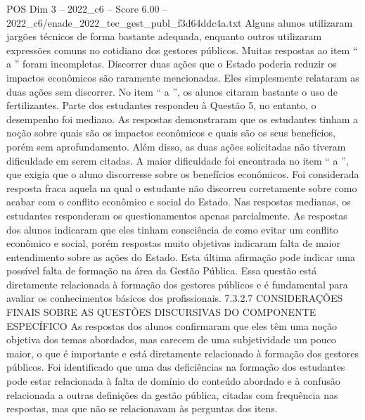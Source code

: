 \begin{textsample}{POS Dim 3 – 2022\_c6 – Score 6.00 – 2022\_c6/enade\_2022\_tec\_gest\_publ\_f3d64ddc4a.txt}
Alguns alunos utilizaram jargões técnicos de forma bastante adequada, enquanto outros utilizaram expressões comuns no cotidiano dos gestores públicos.
Muitas respostas ao item “ a ” foram incompletas.
Discorrer duas ações que o Estado poderia reduzir os impactos econômicos são raramente mencionadas.
Eles simplesmente relataram as duas ações sem discorrer.
No item “ a ”, os alunos citaram bastante o uso de fertilizantes.
Parte dos estudantes respondeu à Questão 5, no entanto, o desempenho foi mediano.
As respostas demonstraram que os estudantes tinham a noção sobre quais são os impactos econômicos e quais são os seus benefícios, porém sem aprofundamento.
Além disso, as duas ações solicitadas não tiveram dificuldade em serem citadas.
A maior dificuldade foi encontrada no item “ a ”, que exigia que o aluno discorresse sobre os benefícios econômicos.
Foi considerada resposta fraca aquela na qual o estudante não discorreu corretamente sobre como acabar com o conflito econômico e social do Estado.
Nas respostas medianas, os estudantes responderam os questionamentos apenas parcialmente.
As respostas dos alunos indicaram que eles tinham consciência de como evitar um conflito econômico e social, porém respostas muito objetivas indicaram falta de maior entendimento sobre as ações do Estado.
Esta última afirmação pode indicar uma possível falta de formação na área da Gestão Pública.
Essa questão está diretamente relacionada à formação dos gestores públicos e é fundamental para avaliar os conhecimentos básicos dos profissionais. 7.3.2.7 CONSIDERAÇÕES FINAIS SOBRE AS QUESTÕES DISCURSIVAS DO COMPONENTE ESPECÍFICO As respostas dos alunos confirmaram que eles têm uma noção objetiva dos temas abordados, mas carecem de uma subjetividade um pouco maior, o que é importante e está diretamente relacionado à formação dos gestores públicos.
Foi identificado que uma das deficiências na formação dos estudantes pode estar relacionada à falta de domínio do conteúdo abordado e à confusão relacionada a outras definições da gestão pública, citadas com frequência nas respostas, mas que não se relacionavam às perguntas dos itens.

\end{textsample}
